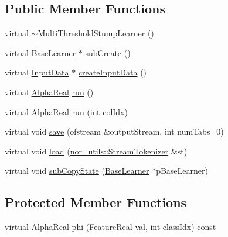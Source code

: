 \subsection*{Public Member Functions}
\begin{DoxyCompactItemize}
\item 
virtual \hyperlink{classMultiBoost_1_1MultiThresholdStumpLearner_a856fc2316eb840bc782b60651a86b727}{$\sim$MultiThresholdStumpLearner} ()
\item 
virtual \hyperlink{classMultiBoost_1_1BaseLearner}{BaseLearner} $\ast$ \hyperlink{classMultiBoost_1_1MultiThresholdStumpLearner_ad924c25c6b9e850621095b26b17deff6}{subCreate} ()
\item 
virtual \hyperlink{classMultiBoost_1_1InputData}{InputData} $\ast$ \hyperlink{classMultiBoost_1_1MultiThresholdStumpLearner_a9c3040ae7a285d0949b1ae277709f6a1}{createInputData} ()
\item 
virtual \hyperlink{Defaults_8h_a80184c4fd10ab70a1a17c5f97dcd1563}{AlphaReal} \hyperlink{classMultiBoost_1_1MultiThresholdStumpLearner_a9f82c8803d80e1a64427aaca042d37ff}{run} ()
\item 
virtual \hyperlink{Defaults_8h_a80184c4fd10ab70a1a17c5f97dcd1563}{AlphaReal} \hyperlink{classMultiBoost_1_1MultiThresholdStumpLearner_a04e20d164fbe57b89c69a3518a06943c}{run} (int colIdx)
\item 
virtual void \hyperlink{classMultiBoost_1_1MultiThresholdStumpLearner_a0dd15d2b44a067988ff2496e2efe5aab}{save} (ofstream \&outputStream, int numTabs=0)
\item 
virtual void \hyperlink{classMultiBoost_1_1MultiThresholdStumpLearner_a3dc38b2a4c1923866a2e63072c4a0c89}{load} (\hyperlink{classnor__utils_1_1StreamTokenizer}{nor\_\-utils::StreamTokenizer} \&st)
\item 
virtual void \hyperlink{classMultiBoost_1_1MultiThresholdStumpLearner_a093c9a16e80ab2fe90470c43f24b0bfb}{subCopyState} (\hyperlink{classMultiBoost_1_1BaseLearner}{BaseLearner} $\ast$pBaseLearner)
\end{DoxyCompactItemize}
\subsection*{Protected Member Functions}
\begin{DoxyCompactItemize}
\item 
virtual \hyperlink{Defaults_8h_a80184c4fd10ab70a1a17c5f97dcd1563}{AlphaReal} \hyperlink{classMultiBoost_1_1MultiThresholdStumpLearner_a03dcf4e724c5be8aa72dba6d5169cd56}{phi} (\hyperlink{Defaults_8h_a3a11cfe6a5d469d921716ca6291e934f}{FeatureReal} val, int classIdx) const 
\end{DoxyCompactItemize}

